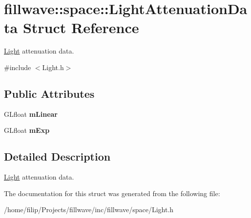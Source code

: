 \hypertarget{structfillwave_1_1space_1_1LightAttenuationData}{}\section{fillwave\+:\+:space\+:\+:Light\+Attenuation\+Data Struct Reference}
\label{structfillwave_1_1space_1_1LightAttenuationData}


\hyperlink{classfillwave_1_1space_1_1Light}{Light} attenuation data.  




{\ttfamily \#include $<$Light.\+h$>$}

\subsection*{Public Attributes}
\begin{DoxyCompactItemize}
\item 
\hypertarget{structfillwave_1_1space_1_1LightAttenuationData_ad353a42e530d6639ff16c02abae3db24}{}G\+Lfloat {\bfseries m\+Linear}\label{structfillwave_1_1space_1_1LightAttenuationData_ad353a42e530d6639ff16c02abae3db24}

\item 
\hypertarget{structfillwave_1_1space_1_1LightAttenuationData_ac49051c6fa1ae1641fb2fb9554a6d2be}{}G\+Lfloat {\bfseries m\+Exp}\label{structfillwave_1_1space_1_1LightAttenuationData_ac49051c6fa1ae1641fb2fb9554a6d2be}

\end{DoxyCompactItemize}


\subsection{Detailed Description}
\hyperlink{classfillwave_1_1space_1_1Light}{Light} attenuation data. 

The documentation for this struct was generated from the following file\+:\begin{DoxyCompactItemize}
\item 
/home/filip/\+Projects/fillwave/inc/fillwave/space/Light.\+h\end{DoxyCompactItemize}
